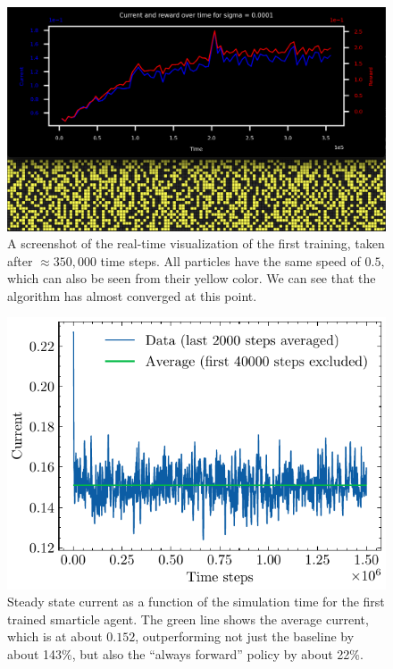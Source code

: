 \begin{figure}[H]
    \centering
    \includegraphics[width=\textwidth]{first_training_screenshot.png}
    \caption{A screenshot of the real-time visualization of the first training, taken after $\approx 350,000$ time steps. All particles have the same speed of $0.5$, which can also be seen from their yellow color. We can see that the algorithm has almost converged at this point.}
    \label{fig:first_training_screenshot}
\end{figure}

\begin{figure}[H]
    \centering
    \includegraphics{equal_speeds.pdf}
    \caption{Steady state current as a function of the simulation time for the first trained smarticle agent. The green line shows the average current, which is at about $0.152$, outperforming not just the baseline by about 143\%, but also the \enquote{always forward} policy by about 22\%.}
    \label{fig:equal_speeds}
\end{figure}

